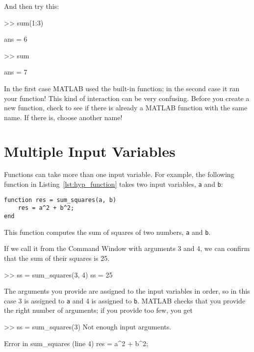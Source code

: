 And then try this:

\begin{code}
>> sum(1:3)

ans = 6

>> sum

ans = 7
\end{code}

In the first case MATLAB used the built-in function; in the second
case it ran your function!  This kind of interaction can be very
confusing.  Before you create a new function, check to see if there is
already a MATLAB function with the same name.  If there is, choose
another name!

\section{Multiple Input Variables}
\label{hypotenuse}


Functions can take more than one input variable.
For example, the following function in Listing~\ref{lst:hyp_function} takes two input variables,
\lstinline{a} and \lstinline{b}:

\begin{lstlisting}[caption={A function that computes the sum of squares of two numbers}, label={lst:hyp_function}]
function res = sum_squares(a, b)
    res = a^2 + b^2;
end
\end{lstlisting}

This function computes the sum of squares of two numbers, \lstinline{a}
and \lstinline{b}.

If we call it from the Command Window with arguments 3 and 4, we can
confirm that the sum of their squares is 25.

\begin{code}
>> ss = sum_squares(3, 4)
ss = 25
\end{code}

The arguments you provide are assigned to the input variables in
order, so in this case 3 is assigned to \lstinline{a} and 4 is assigned to
\lstinline{b}.  MATLAB checks that you provide the right number of arguments;
if you provide too few, you get

\begin{code}
>> ss = sum_squares(3)
Not enough input arguments.

Error in sum_squares (line 4)
    res = a^2 + b^2;
\end{code}

